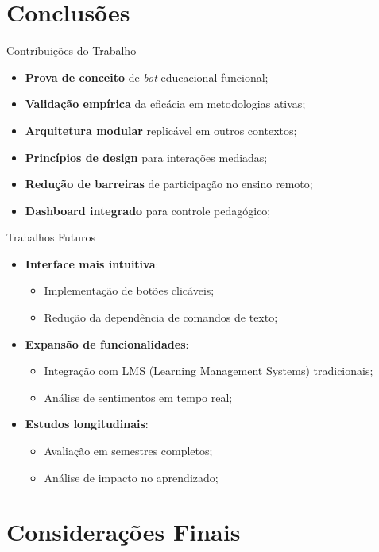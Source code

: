 \documentclass[aspectratio=169]{beamer}
\begin{document}
{\section{Conclusões}

\begin{frame}{Contribuições do Trabalho}
  \begin{itemize}
  \item \textbf{Prova de conceito} de \textit{bot} educacional funcional;
  \item \textbf{Validação empírica} da eficácia em metodologias ativas;
  \item \textbf{Arquitetura modular} replicável em outros contextos;
  \item \textbf{Princípios de design} para interações mediadas;
  \item \textbf{Redução de barreiras} de participação no ensino remoto;
  \item \textbf{Dashboard integrado} para controle pedagógico;
  \end{itemize}
\end{frame}

\begin{frame}{Trabalhos Futuros}
  \begin{itemize}
  \item \textbf{Interface mais intuitiva}:
    \begin{itemize}
    \item Implementação de botões clicáveis;
    \item Redução da dependência de comandos de texto;
    \end{itemize}
  \item \textbf{Expansão de funcionalidades}:
    \begin{itemize}
    \item Integração com LMS (Learning Management Systems) tradicionais;
    \item Análise de sentimentos em tempo real;
    \end{itemize}
  \item \textbf{Estudos longitudinais}:
    \begin{itemize}
    \item Avaliação em semestres completos;
    \item Análise de impacto no aprendizado;
    \end{itemize}
  \end{itemize}
\end{frame}

\section*{Considerações Finais}

}
\end{document}
